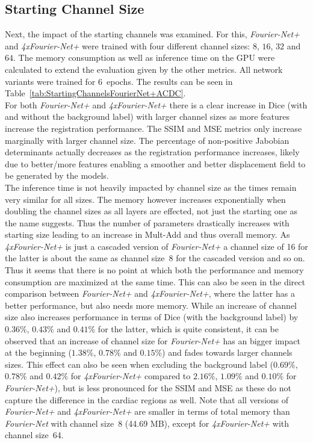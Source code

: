 \documentclass[english,version-2022-01]{uzl-thesis} %
\begin{document}
\subsection{Starting Channel Size} \label{SubSec:ResultsStartingChannelsACDC}
Next, the impact of the starting channels was examined. For this, \emph{Fourier-Net+} and \emph{4xFourier-Net+} were trained with four different channel sizes: $8$, $16$, $32$ and $64$. The memory consumption as well as inference time on the GPU were calculated to extend the evaluation given by the other metrics. All network variants were trained for 6~epochs. The results can be seen in Table~\ref{tab:StartingChannelsFourierNet+ACDC}.\\
For both \emph{Fourier-Net+} and \emph{4xFourier-Net+} there is a clear increase in Dice (with and without the background label) with larger channel sizes as more features increase the registration performance. The SSIM and MSE metrics only increase marginally with larger channel size. The percentage of non-positive Jabobian determinants actually decreases as the registration performance increases, likely due to better/more features enabling a smoother and better displacement field to be generated by the models. \\
The inference time is not heavily impacted by channel size as the times remain very similar for all sizes. The memory however increases exponentially when doubling the channel sizes as all layers are effected, not just the starting one as the name suggests. Thus the number of parameters drastically increases with starting size leading to an increase in Mult-Add and thus overall memory. As \emph{4xFourier-Net+} is just a cascaded version of \emph{Fourier-Net+} a channel size of 16 for the latter is about the same as channel size~8 for the cascaded version and so on. Thus it seems that there is no point at which both the performance and memory consumption are maximized at the same time. This can also be seen in the direct comparison between \emph{Fourier-Net+} and \emph{4xFourier-Net+}, where the latter has a better performance, but also needs more memory. While an increase of channel size also increases performance in terms of Dice (with the background label) by $0.36\%$, $0.43\%$ and $0.41\%$ for the latter, which is quite consistent, it can be observed that an increase of channel size for \emph{Fourier-Net+} has an bigger impact at the beginning ($1.38\%$, $0.78\%$ and $0.15\%$) and fades towards larger channels sizes. This effect can also be seen when excluding the background label ($0.69\%$, $0.78\%$ and $0.42\%$ for \emph{4xFourier-Net+} compared to $2.16\%$, $1.09\%$ and $0.10\%$ for \emph{Fourier-Net+}), but is less pronounced for the SSIM and MSE as these do not capture the difference in the cardiac regions as well. Note that all versions of \emph{Fourier-Net+} and \emph{4xFourier-Net+} are smaller in terms of total memory than \emph{Fourier-Net} with channel size~8 (44.69 MB), except for \emph{4xFourier-Net+} with channel size~64.
\end{document}
